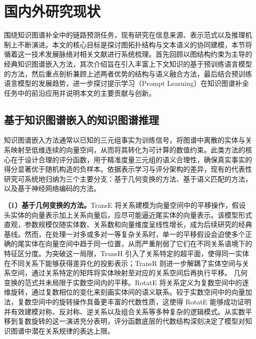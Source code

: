 \section{国内外研究现状}
围绕知识图谱补全中的链路预测任务，现有研究在信息来源、表示范式以及推理机制上不断演进。本文的核心目标是探讨图拓扑结构与文本语义的协同建模，本节将循着这一技术发展脉络对相关文献进行系统梳理。首先回顾以图结构约束为主导的经典知识图谱嵌入方法，其次介绍旨在引入丰富上下文知识的基于预训练语言模型的方法，然后重点剖析兼顾上述两者优势的结构与语义融合方法，最后结合预训练语言模型的发展趋势，进一步探讨提示学习（Prompt Learning）在知识图谱补全任务中的前沿应用并说明本文的主要贡献与创新。

\subsection{基于知识图谱嵌入的知识图谱推理}

知识图谱嵌入方法通常以已知的三元组事实为训练信号，将图谱中离散的实体与关系映射至低维连续的向量空间，从而将其转化为可计算的数值约束。此类方法的核心在于设计合理的评分函数，用于精准度量三元组的语义合理性，确保真实事实的得分显著优于随机构造的负样本。依据表示学习与评分架构的差异，现有的代表性研究可系统地归纳为三个主要分支：基于几何变换的方法、基于语义匹配的方法，以及基于神经网络编码的方法\cite{KGReview_Nickel_2016}。

\textbf{（1）基于几何变换的方法。}TransE 将关系建模为向量空间中的平移操作，假设头实体的向量表示加上关系向量后，应尽可能逼近尾实体的向量表示\cite{bordes2013translating}。该模型形式直观，参数规模仅随实体数、关系数和向量维度呈线性增长，成为后续研究的经典基线。然而，在处理一对多或多对一等复杂关系时，单一的平移假设会迫使多个正确的尾实体在向量空间中趋于同一位置，从而严重削弱了它们在不同关系语境下的特征区分度。为突破这一局限，TransH 引入了关系特定的超平面，使得同一实体在不同关系下能够获得差异化的投影表示\cite{TransH_Wang_2014}；TransR 则进一步解耦了实体空间与关系空间，通过关系特定的矩阵将实体映射至对应的关系空间后再执行平移\cite{TransR_Lin_2015}。
几何变换的范式并未局限于实数空间内的平移。RotatE 将关系定义为复数空间中的逐维旋转，通过复数相位的变化来刻画实体间的语义联系\cite{sun2019rotate}。较于实数空间中的向量加法，复数空间中的旋转操作具备更丰富的代数性质，这使得 RotatE 能够成功证明并有效建模对称、反对称、逆关系以及组合关系等多种复杂的逻辑模式。从实数平移到复数旋转的这一演进充分表明，评分函数底层的代数结构深刻决定了模型对知识图谱中潜在关系规律的表达上限。

